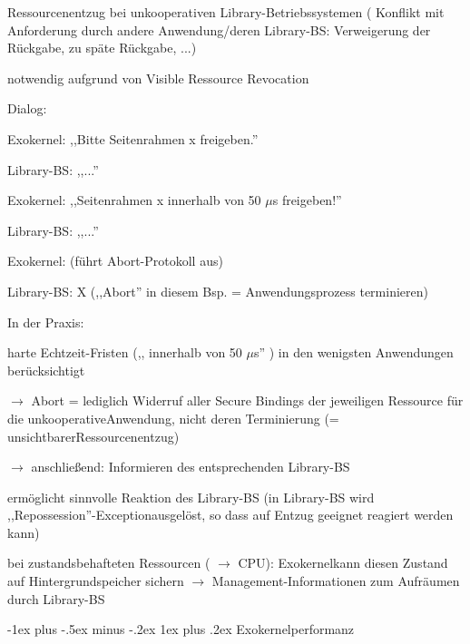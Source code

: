 \documentclass[a4paper]{article}
\makeatletter
\renewcommand{\subsubsection}{\@startsection{subsubsection}{3}{0mm}%
 {-1ex plus -.5ex minus -.2ex}%
 {1ex plus .2ex}%
 {\normalfont\small\bfseries}}
\makeatother
\begin{document}
\begin{multicols}{3}
    \begin{itemize*}
        \item Ressourcenentzug bei unkooperativen Library-Betriebssystemen (
        Konflikt mit Anforderung durch andere Anwendung/deren Library-BS:
        Verweigerung der Rückgabe, zu späte Rückgabe, ...)
        \item notwendig aufgrund von Visible Ressource Revocation
        \item Dialog:
        \begin{itemize*}
            \item Exokernel: ,,Bitte Seitenrahmen x freigeben.''
            \item Library-BS: ,,...''
            \item Exokernel: ,,Seitenrahmen x innerhalb von 50 $\mu$s freigeben!''
            \item Library-BS: ,,...''
            \item Exokernel: (führt Abort-Protokoll aus)
            \item Library-BS: X (,,Abort'' in diesem Bsp. = Anwendungsprozess terminieren)
        \end{itemize*}
        \item In der Praxis:
        \begin{itemize*}
            \item harte Echtzeit-Fristen (,, innerhalb von 50 $\mu$s'' ) in den wenigsten Anwendungen berücksichtigt \begin{itemize*} \item[$\rightarrow$] Abort = lediglich Widerruf aller Secure Bindings der jeweiligen Ressource für die unkooperativeAnwendung, nicht deren Terminierung (= unsichtbarerRessourcenentzug) \item[$\rightarrow$] anschließend: Informieren des entsprechenden Library-BS \end{itemize*}
            \item ermöglicht sinnvolle Reaktion des Library-BS (in Library-BS wird ,,Repossession''-Exceptionausgelöst, so dass auf Entzug geeignet reagiert werden kann)
            \item bei zustandsbehafteten Ressourcen ( $\rightarrow$ CPU): Exokernelkann diesen Zustand auf Hintergrundspeicher sichern $\rightarrow$ Management-Informationen zum Aufräumen durch Library-BS
        \end{itemize*}
    \end{itemize*}


    \subsubsection{Exokernelperformanz}


\end{multicols}
\end{document}
